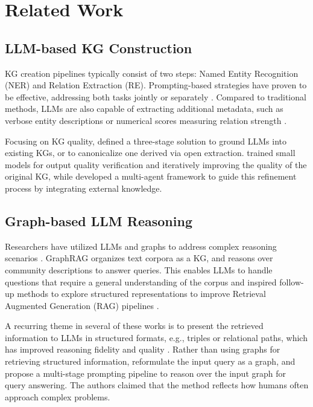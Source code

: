 \section{Related Work}
\label{section:related_work}

\subsection{LLM-based KG Construction}
\label{section:related_work_kg_construction}

KG creation pipelines typically consist of two steps: Named Entity Recognition (NER) and Relation Extraction (RE). Prompting-based strategies have proven to be effective, addressing both tasks jointly \cite{DBLP:journals/corr/abs-2404-16130,guo2024lightrag} or separately \cite{jimenez2024hipporag,gutierrez2025from}. Compared to traditional methods, LLMs are also capable of extracting additional metadata, such as verbose entity descriptions or numerical scores measuring relation strength \cite{guo2024lightrag}.

Focusing on KG quality, \citet{zhang2024extract} defined a three-stage solution to ground LLMs into existing KGs, or to canonicalize one derived via open extraction. \citet{DBLP:conf/acl/HanCBS24} trained small models for output quality verification and iteratively improving the quality of the original KG, while \citet{zhu2024llms} developed a multi-agent framework to guide this refinement process by integrating external knowledge.

\subsection{Graph-based LLM Reasoning}
\label{section:related_work_llm_reasoning}

Researchers have utilized LLMs and graphs to address complex reasoning scenarios \cite{pan2024unifying}. GraphRAG \cite{DBLP:journals/corr/abs-2306-16092} organizes text corpora as a KG, and reasons over community descriptions to answer queries. This enables LLMs to handle questions that require a general understanding of the corpus and inspired follow-up methods to explore structured representations to improve Retrieval Augmented Generation (RAG) pipelines \cite{peng2024graph, han2024retrieval}.

A recurring theme in several of these works is to present the retrieved information to LLMs in structured formats, e.g., triples or relational paths, which has improved reasoning fidelity and quality \cite{DBLP:conf/iclr/MaXJLQYMG25,sun2024thinkongraph,liu2024knowledge,wen2024mindmap}. Rather than using graphs for retrieving structured information, \citet{cheng2024structure} reformulate the input query as a graph, and propose a multi-stage prompting pipeline to reason over the input graph for query answering. The authors claimed that the method reflects how humans often approach complex problems.

